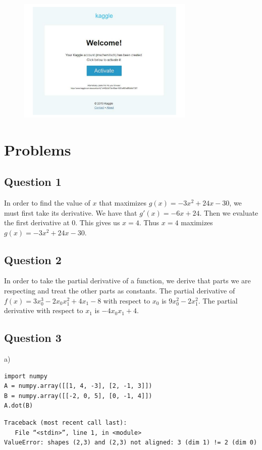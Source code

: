 \documentclass[a4paper]{article}
\begin{document}
\begin{figure}[h]
  \begin{center}
    \includegraphics[width=0.75\textwidth]{kaggle.pdf}
  \end{center}
\end{figure}

\section{Problems}

\subsection{Question 1}
In order to find the value of $x$ that maximizes $g(x)=-3x^{2}+24x-30$, we must first take its derivative. We have that $g'(x)=-6x+24$. Then we evaluate the first derivative at 0. This gives us $x=4$. Thus $x=4$ maximizes $g(x)=-3x^{2}+24x-30$.

\subsection{Question 2}
In order to take the partial derivative of a function, we derive that parts we are respecting and treat the other parts as constants. The partial derivative of $f(x)=3x_{0}^{3}-2x_{0}x_{1}^{2}+4x_{1}-8$ with respect to $x_{0}$ is $9x_{0}^{2}-2x_{1}^{2}$. The partial derivative with respect to $x_{1}$ is $-4x_{0}x_{1}+4$.

\subsection{Question 3}
a)
\begin{lstlisting}[frame=single]
import numpy
A = numpy.array([[1, 4, -3], [2, -1, 3]])
B = numpy.array([[-2, 0, 5], [0, -1, 4]])
A.dot(B)
\end{lstlisting}
\begin{lstlisting}
Traceback (most recent call last):
   File “<stdin>”, line 1, in <module>
ValueError: shapes (2,3) and (2,3) not aligned: 3 (dim 1) != 2 (dim 0)
\end{lstlisting}
\end{document}
